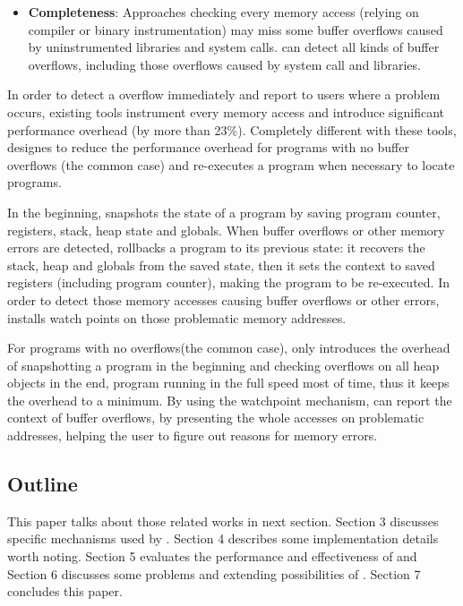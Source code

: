 \begin{itemize}
\item \textbf{Completeness}:
Approaches checking every memory access (relying on compiler or binary instrumentation)
may miss some buffer overflows caused by uninstrumented libraries and system calls. 
\doubletake{} can detect all kinds of buffer overflows, including those overflows caused by
system call and libraries.
  
\end{itemize} 


In order to detect a overflow immediately and report to users where a problem occurs,
existing tools instrument every memory access and introduce significant 
performance overhead (by more than 23\%). 
Completely different with these tools, \doubletake{} designes to reduce the performance overhead for 
programs with no buffer overflows (the common case) and re-executes a program when necessary to locate 
programs. 

In the beginning, \doubletake{} snapshots the state of a program by saving program counter,
registers, stack, heap state and globals. 
When buffer overflows or other memory errors are detected, \doubletake{} rollbacks a program
to its previous state: it recovers the stack, heap and globals from the saved state,
then it sets the context to saved registers (including program counter),
 making the program to be re-executed.
In order to detect those memory accesses causing buffer overflows or other errors, 
\doubletake{} installs watch points on those problematic memory addresses. 
  
For programs with no overflows(the common case), \doubletake{} only introduces the overhead 
of snapshotting a program in the beginning and checking overflows on all heap objects 
in the end, program running in the full speed most of time,  
thus it keeps the overhead to a minimum.
By using the watchpoint mechanism, \doubletake{} can report the context of buffer overflows, by presenting the whole accesses on problematic addresses, helping the user to figure out reasons for memory errors.

\subsection{Outline}
This paper talks about those related works in next section. Section 3 discusses specific mechanisms 
used by \doubletake{}. Section 4 describes some implementation details worth noting. 
Section 5 evaluates the performance and effectiveness of \doubletake{} and Section 6
discusses some problems and extending possibilities of \doubletake{}.
Section 7 concludes this paper. 
